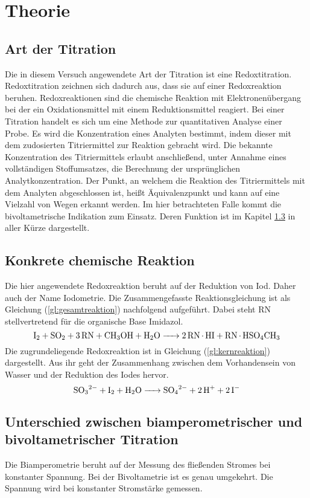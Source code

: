 \section{Theorie}
\label{sec:theorie}

\subsection{Art der Titration}
Die in diesem Versuch angewendete Art der Titration ist eine Redoxtitration. Redoxtitration zeichnen sich dadurch aus, dass sie auf einer Redoxreaktion beruhen. Redoxreaktionen sind die chemische Reaktion mit Elektronenübergang bei der ein Oxidationsmittel mit einem Reduktionsmittel reagiert.\cite{redoxreaktion} Bei einer Titration handelt es sich um eine Methode zur quantitativen Analyse einer Probe. Es wird die Konzentration eines Analyten bestimmt, indem dieser mit dem zudosierten Titriermittel zur Reaktion gebracht wird.\cite{titration} Die bekannte Konzentration des Titriermittels erlaubt anschließend, unter Annahme eines vollständigen Stoffumsatzes, die Berechnung der ursprünglichen Analytkonzentration. Der Punkt, an welchem die Reaktion des Titriermittels mit dem Analyten abgeschlossen ist, heißt Äquivalenzpunkt und kann auf eine Vielzahl von Wegen erkannt werden. Im hier betrachteten Falle kommt die bivoltametrische Indikation zum Einsatz. Deren Funktion ist  im Kapitel  \ref{sec:unterschiedBivoltBiamp} in aller Kürze dargestellt.
\subsection{Konkrete chemische Reaktion}
Die hier angewendete Redoxreaktion beruht auf der Reduktion von Iod. Daher auch der Name Iodometrie. Die Zusammengefasste Reaktionsgleichung ist als Gleichung (\ref{gl:gesamtreaktion}) nachfolgend aufgeführt. Dabei steht RN stellvertretend für die organische Base Imidazol. 
\begin{equation}\label{gl:gesamtreaktion}
	\ce{I2 + SO2 + 3 RN + CH3OH + H2O -> 2RN*HI + RN*HSO4CH3}
\end{equation}
Die zugrundeliegende Redoxreaktion ist in Gleichung (\ref{gl:kernreaktion}) dargestellt. Aus ihr geht der Zusammenhang zwischen dem Vorhandensein von Wasser und der Reduktion des Iodes hervor.
\begin{equation}\label{gl:kernreaktion}
	\ce{SO3^2- +I2 +H2O -> SO4^2- + 2H^+ +2I-}
\end{equation}
\subsection{Unterschied zwischen biamperometrischer und bivoltametrischer Titration}\label{sec:unterschiedBivoltBiamp}

Die Biamperometrie beruht auf der Messung des fließenden Stromes bei konstanter Spannung. Bei der Bivoltametrie ist es genau umgekehrt. Die Spannung wird bei konstanter Stromstärke gemessen.\cite{biamperometrie}\cite{bivoltametrie}

